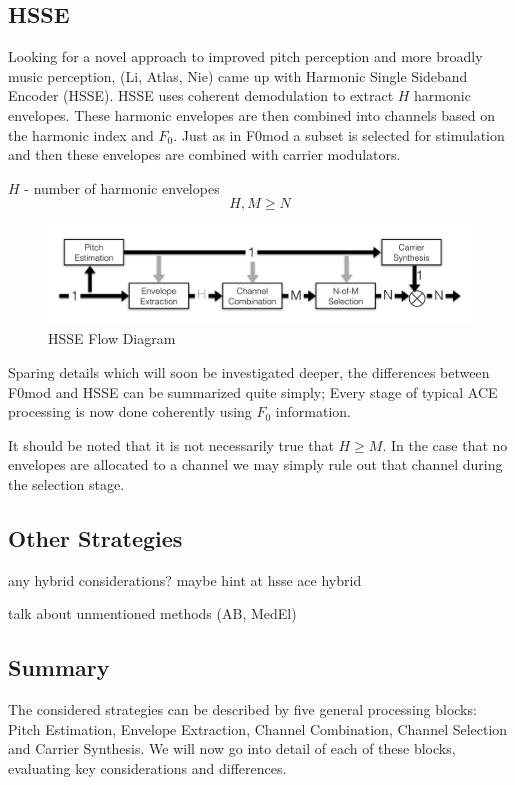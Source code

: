 \documentclass [11pt, proquest] {uwthesis}[2015/03/03]
\begin{document}
\subsection{HSSE}

Looking for a novel approach to improved pitch perception and more broadly music perception, (Li, Atlas, Nie) came up with Harmonic Single Sideband Encoder (HSSE).  HSSE uses coherent demodulation to extract $H$ harmonic envelopes.  These harmonic envelopes are then combined into channels based on the harmonic index and $F_0$.  Just as in F0mod a subset is selected for stimulation and then these envelopes are combined with carrier modulators.

$H$ - number of harmonic envelopes
$$H, M \geq N$$

\begin{figure}[!ht]
  \centering
    \includegraphics[width=1\textwidth]{HSSE_flow_diagramTEMP}   
    \caption{HSSE Flow Diagram}
\end{figure}

Sparing details which will soon be investigated deeper, the differences between F0mod and HSSE can be summarized quite simply;  Every stage of typical ACE processing is now done coherently using $F_0$ information.

It should be noted that it is not necessarily true that $H \geq M$.  In the case that no envelopes are allocated to a channel we may simply rule out that channel during the selection stage.

\subsection{Other Strategies}

any hybrid considerations?  maybe hint at hsse ace hybrid

talk about unmentioned methods (AB, MedEl)

\subsection{Summary}

The considered strategies can be described by five general processing blocks: Pitch Estimation, Envelope Extraction, Channel Combination, Channel Selection and Carrier Synthesis.  We will now go into detail of each of these blocks, evaluating key considerations and differences.
\end{document}
